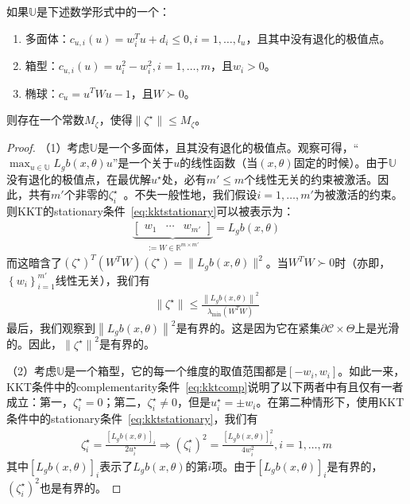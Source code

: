 \begin{proposition}\label{prop:boundeddual}
    如果$\mathbb{U}$是下述数学形式中的一个：
    \begin{enumerate}
        \item 多面体：$c_{u,i}(u) = w_i^T u + d_i \le 0, i = 1, \dots, l_u$，且其中没有退化的极值点。
        \item 箱型：$c_{u,i}(u) = u_i^2 - w_i^2, i = 1, \dots, m$，且$w_i > 0$。
        \item 椭球：$c_u = u^T W u - 1$，且$W \succ 0$。
    \end{enumerate}
    则存在一个常数$M_\zeta$，使得$\parallel \zeta^\star \parallel \le M_\zeta$。
\end{proposition}
\begin{proof}
    （1）考虑$\mathbb{U}$是一个多面体，且其没有退化的极值点。观察可得，“$\max_{u \in \mathbb{U}} L_gb(x, \theta) u$”是一个关于$u$的线性函数（当$(x, \theta)$固定的时候）。由于$\mathbb{U}$没有退化的极值点，在最优解$u^\star$处，必有$m' \le m$个线性无关的约束被激活。因此，共有$m'$个非零的$\zeta_i^\star$~\cite{bertsimas97book-lp}。不失一般性地，我们假设$i = 1, \dots, m'$为被激活的约束。则KKT的stationary条件~\eqref{eq:kktstationary}可以被表示为：
    \begin{eqnarray}
      \underbrace{
        \left[ \begin{matrix}
          w_1 & \cdots & w_{m'}
        \end{matrix} \right]
      }_{:= W \in \mathbb{R}^{m \times m'}} = L_gb(x, \theta)
    \end{eqnarray}
    而这暗含了$(\zeta^\star)^T (W^TW) (\zeta^\star) = \parallel L_gb(x, \theta) \parallel^2$。当$W^TW \succ 0$时（亦即，$\left\{ w_i \right\}_{i=1}^{m'}$线性无关），我们有
    \begin{eqnarray}
      \left\lVert \zeta^\star \right\rVert \le \frac{
        \left\lVert L_gb(x, \theta) \right\rVert^2
      }{
        \lambda_{\min} (W^T W)
      }
    \end{eqnarray}
    最后，我们观察到$\left\lVert L_gb(x, \theta) \right\rVert^2$是有界的。这是因为它在紧集$\partial \mathcal{C} \times \Theta$上是光滑的。因此，$\left\lVert \zeta^\star \right\rVert^2$是有界的。
  
    （2）考虑$\mathbb{U}$是一个箱型，它的每一个维度的取值范围都是$[-w_i, w_i]$。如此一来，KKT条件中的complementarity条件~\eqref{eq:kktcomp}说明了以下两者中有且仅有一者成立：第一，$\zeta_i^\star = 0$；第二，$\zeta_i^\star \ne 0$，但是$u_i^\star = \pm w_i$。在第二种情形下，使用KKT条件中的stationary条件~\eqref{eq:kktstationary}，我们有
    \begin{eqnarray}
      \zeta_i^\star = \frac{
        [L_gb(x, \theta)]_i
      }{2u_i^\star} \Rightarrow 
      (\zeta_i^\star)^2 = \frac{
        [L_gb(x, \theta)]_i^2
      }{4 w_i^2}, i = 1, \dots, m
    \end{eqnarray}
    其中$[L_gb(x, \theta)]_i$表示了$L_gb(x, \theta)$的第$i$项。由于$[L_gb(x, \theta)]_i$是有界的，$(\zeta_i^\star)^2$也是有界的。
  

\end{proof}
